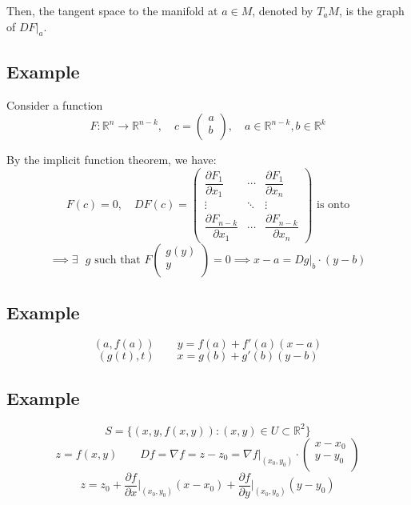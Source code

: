\documentclass[11pt]{article}
\begin{document}
Then, the tangent space to the manifold at $a \in M$, denoted by $T_a M$, is the graph of $DF\big|_a$.

\subsection*{Example}
Consider a function 
\[
F : \mathbb{R}^n \rightarrow \mathbb{R}^{n-k}, \quad c = \begin{pmatrix}
    a \\
    b \\
\end{pmatrix}, \quad a \in \mathbb{R}^{n-k}, b \in \mathbb{R}^k
\]

By the implicit function theorem, we have:
\[
F(c) = 0, \quad DF(c) = \begin{pmatrix}
    \dfrac{\partial F_1}{\partial x_1} & \cdots & \dfrac{\partial F_1}{\partial x_n} \\
    \vdots & \ddots & \vdots \\
    \dfrac{\partial F_{n-k}}{\partial x_1} & \cdots & \dfrac{\partial F_{n-k}}{\partial x_n}
\end{pmatrix} \text{ is onto}
\]
\[
\implies \exists\text{ } g \text{ such that } F \begin{pmatrix}
    g(y) \\
    y \\
\end{pmatrix} = 0 \implies x - a = Dg\big|_b \cdot (y - b)
\]

\subsection*{Example}
\[
(a, f(a)) \quad \quad y = f(a) + f'(a)(x - a)
\]
\[
(g(t), t) \quad \quad x = g(b) + g'(b)(y - b)
\]

\subsection*{Example}
\[
S = \{(x,y,f(x,y)) : (x,y) \in U \subset \mathbb{R}^2\}
\]
\[
z = f(x,y) \quad \quad Df = \nabla f = z - z_0 = \nabla f \big|_{(x_0,y_0)} \cdot \begin{pmatrix}
    x - x_0 \\
    y - y_0 \\
\end{pmatrix}
\]
\[
z = z_0 + \frac{\partial f}{\partial x} \big|_{(x_0,y_0)} (x - x_0) + \frac{\partial f}{\partial y} \big|_{(x_0,y_0)} (y - y_0)
\]
\end{document}
